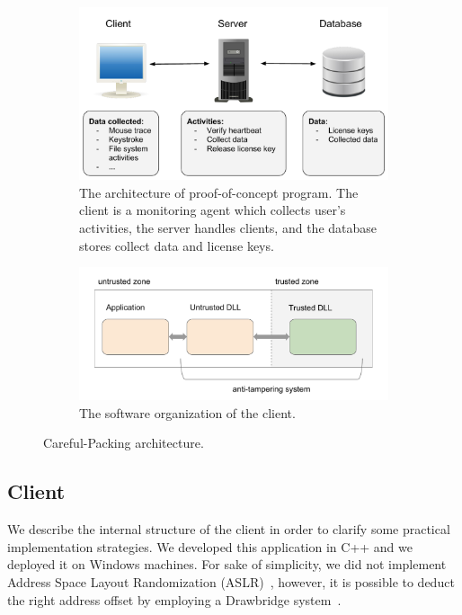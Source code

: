 \begin{figure}[t]
	\centering
	\begin{subfigure}[t]{0.45\textwidth}
		\centering
		\includegraphics[width=\linewidth]{fig_c3/architecture.pdf}
		\caption{The architecture of proof-of-concept program. The client is a 
		monitoring agent which collects user's activities, the server handles 
		clients, and the database stores collect data and license keys.}
		\label{fig:architecture}
	\end{subfigure}
	\hfill
	\begin{subfigure}[t]{0.45\textwidth}
		\centering
		\includegraphics[width=\textwidth]{fig_c3/clientarchitecture.pdf}
		\caption{The software organization of the client.}
		\label{fig:clientarchitecture}
	\end{subfigure}
	\caption{Careful-Packing architecture.}
\end{figure}

\subsection{Client}
We describe the internal structure of the client in order to clarify some 
practical implementation strategies.
We developed this application in C++ and we deployed it on Windows machines.
For sake of simplicity, we did not implement Address Space Layout Randomization 
(ASLR)~\cite{snow2013just}, however, it is possible to deduct the right address 
offset by employing a Drawbridge system~\cite{porter2011rethinking}.

